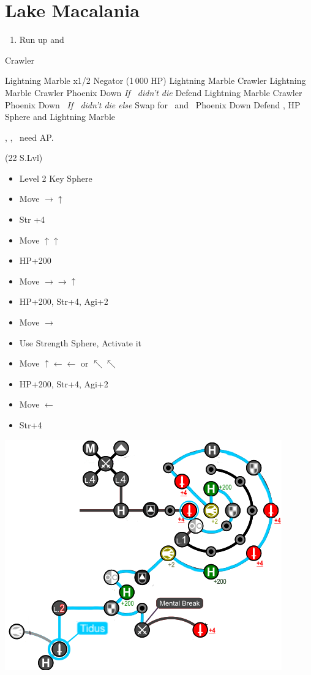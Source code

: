 \chapter{Lake Macalania}

\begin{enumerate}
	\item Run up and \sd
\end{enumerate}
\begin{battle}[16000]{Crawler}
	\begin{itemize}
		\switch{\tidus}{\rikku}
		\rikkuf Lightning Marble x1/2 Negator (1\,000 HP)
		\rikkuf Lightning Marble Crawler
		\kimahrif Lightning Marble Crawler
		\luluf Phoenix Down \rikku
		\switch{\kimahri}{\yuna} \textit{If \kimahri\ didn't die}
		\yunaf Defend
		\rikkuf Lightning Marble Crawler
		\luluf Phoenix Down \rikku\ \textit{If \kimahri\ didn't die else} Swap for \yuna\ and \yuna\ Phoenix Down \rikku
		\switch{\yuna}{\tidus}
		\tidusf Defend
		\rikkuf \od, HP Sphere and Lightning Marble
	\end{itemize}
	\tidus, \yuna, \lulu\ need AP.
\end{battle}
\begin{spheregrid}
	\begin{itemize}
		\tidusf (22 S.Lvl)
		\begin{itemize}
			\item Level 2 Key Sphere
			\item Move $\rightarrow\uparrow$
			\item Str +4
			\item Move $\uparrow\uparrow$
			\item HP+200
			\item Move $\rightarrow\rightarrow\uparrow$
			\item HP+200, Str+4, Agi+2
			\item Move $\rightarrow$
			\item Use Strength Sphere, Activate it
			\item Move $\uparrow\leftarrow\leftarrow$ or $\nwarrow\nwarrow$
			\item HP+200, Str+4, Agi+2
			\item Move $\leftarrow$
			\item Str+4
		\end{itemize}
		\includegraphics[width=.8\columnwidth]{graphics/Tidus_post_crawler}
	\end{itemize}
\end{spheregrid}
